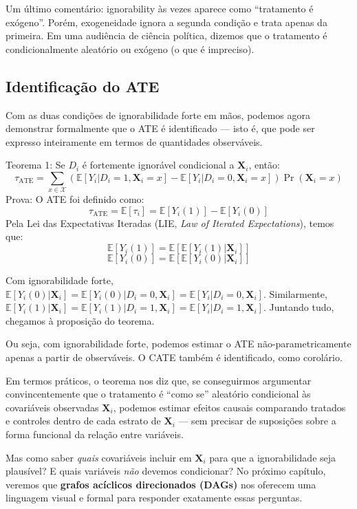 \documentclass[
]{article}
\begin{document}
Um último comentário: ignorability às vezes aparece como ``tratamento é exógeno''. Porém, exogeneidade ignora a segunda condição e trata apenas da primeira. Em uma audiência de ciência política, dizemos que o tratamento é condicionalmente aleatório ou exógeno (o que é impreciso).

\subsection{Identificação do ATE}\label{identificauxe7uxe3o-do-ate}

Com as duas condições de ignorabilidade forte em mãos, podemos agora demonstrar formalmente que o ATE é identificado --- isto é, que pode ser expresso inteiramente em termos de quantidades observáveis.

Teorema 1: Se \(D_i\) é fortemente ignorável condicional a \(\mathbf{X}_i\), então:
\[\tau_{\text{ATE}} = \sum_{x \in \mathcal{X}}\left(\mathbb{E}[Y_i|D_i=1, \mathbf{X}_i = x] - \mathbb{E}[Y_i|D_i=0, \mathbf{X}_i = x]\right)\Pr(\mathbf{X}_i = x)\]
Prova: O ATE foi definido como:
\[\tau_{\text{ATE}} = \mathbb{E}[\tau_i] = \mathbb{E}[Y_i(1)] - \mathbb{E}[Y_i(0)]\]
Pela Lei das Expectativas Iteradas (LIE, \emph{Law of Iterated Expectations}), temos que:
\[\mathbb{E}[Y_i(1)] = \mathbb{E}[\mathbb{E}[Y_i(1)|\mathbf{X}_i]]\]
\[\mathbb{E}[Y_i(0)] = \mathbb{E}[\mathbb{E}[Y_i(0)|\mathbf{X}_i]]\]

Com ignorabilidade forte, \(\mathbb{E}[Y_i(0)|\mathbf{X}_i] = \mathbb{E}[Y_i(0)|D_i=0, \mathbf{X}_i] = \mathbb{E}[Y_i|D_i=0, \mathbf{X}_i]\). Similarmente, \(\mathbb{E}[Y_i(1)|\mathbf{X}_i] = \mathbb{E}[Y_i(1)|D_i=1, \mathbf{X}_i] = \mathbb{E}[Y_i|D_i=1, \mathbf{X}_i]\). Juntando tudo, chegamos à proposição do teorema.

Ou seja, com ignorabilidade forte, podemos estimar o ATE não-parametricamente apenas a partir de observáveis. O CATE também é identificado, como corolário.

Em termos práticos, o teorema nos diz que, se conseguirmos argumentar convincentemente que o tratamento é ``como se'' aleatório condicional às covariáveis observadas \(\mathbf{X}_i\), podemos estimar efeitos causais comparando tratados e controles dentro de cada estrato de \(\mathbf{X}_i\) --- sem precisar de suposições sobre a forma funcional da relação entre variáveis.

Mas como saber \emph{quais} covariáveis incluir em \(\mathbf{X}_i\) para que a ignorabilidade seja plausível? E quais variáveis \emph{não} devemos condicionar? No próximo capítulo, veremos que \textbf{grafos acíclicos direcionados (DAGs)} nos oferecem uma linguagem visual e formal para responder exatamente essas perguntas.
\end{document}
